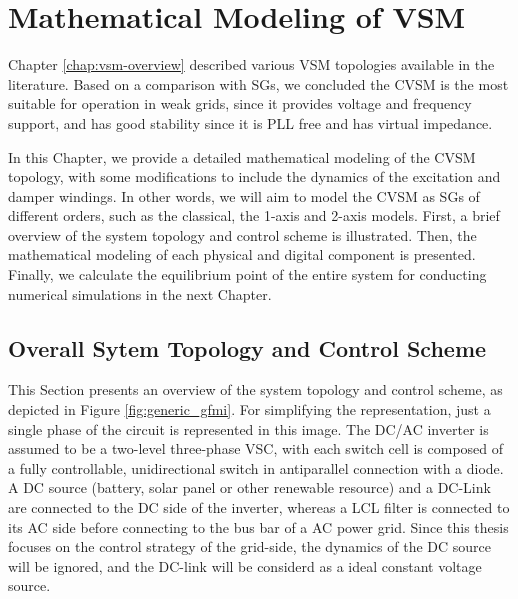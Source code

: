\chapter{Mathematical Modeling of VSM}\label{chap:vsm-modeling}

Chapter \ref{chap:vsm-overview} described various VSM topologies available in
the literature. Based on a comparison with SGs, we concluded the CVSM is the  
most suitable for operation in weak grids, since it provides voltage and
frequency support, and has good stability since it is PLL free and has virtual
impedance. 

In this Chapter, we provide a detailed mathematical modeling of the CVSM
topology, with some modifications to include the dynamics of the excitation and
damper windings. In other words, we will aim to model the CVSM as SGs of
different orders, such as the classical, the 1-axis and 2-axis models. First, a
brief overview of the system topology and control scheme is illustrated. Then,
the mathematical modeling of each physical and digital component is presented.
Finally, we calculate the equilibrium point of the entire system for conducting
numerical simulations in the next Chapter.

\section{Overall Sytem Topology and Control Scheme}

This Section presents an overview of the system topology and control scheme, as
depicted in Figure \ref{fig:generic_gfmi}. For simplifying the representation,
just a single phase of the circuit is represented in this image. The DC/AC
inverter is assumed to be a two-level three-phase VSC, with each switch cell is
composed of a fully controllable, unidirectional switch in antiparallel
connection with a diode. A DC source (battery, solar panel or other renewable
resource) and a DC-Link are connected to the DC side of the inverter, whereas a
LCL filter is connected to its AC side before connecting to the bus bar of a AC
power grid. Since this thesis focuses on the control strategy of the grid-side,
the dynamics of the DC source will be ignored, and the DC-link will be considerd
as a ideal constant voltage source.

